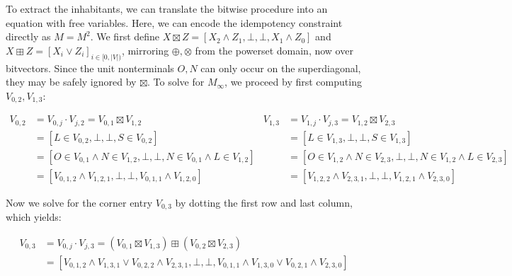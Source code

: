 \documentclass[sigplan,acmsmall,nonacm,screen]{acmart}\settopmatter{printfolios=false,printccs=false,printacmref=false}
\begin{document}

  To extract the inhabitants, we can translate the bitwise procedure into an equation with free variables. Here, we can encode the idempotency constraint directly as $M = M^2$. We first define $X \boxtimes Z = [X_2 \land Z_1, \bot, \bot, X_1 \land Z_0]$ and $X \boxplus Z = [X_i \lor Z_i]_{i \in [0, |V|)}$, mirroring $\oplus, \otimes$ from the powerset domain, now over bitvectors. Since the unit nonterminals $O, N$ can only occur on the superdiagonal, they may be safely ignored by $\boxtimes$. To solve for $M_\infty$, we proceed by first computing $V_{0, 2}, V_{1, 3}$:\vspace{-8pt}

  \begin{small}
  \begin{align*}
    V_{0, 2} &= V_{0, j} \cdot V_{j, 2} = V_{0, 1} \boxtimes V_{1, 2}                         &  V_{1, 3} &= V_{1, j} \cdot V_{j, 3} = V_{1, 2} \boxtimes V_{2, 3}\\
    &= [L \in V_{0, 2}, \bot, \bot, S \in V_{0, 2}]                                           &  &= [L \in V_{1, 3}, \bot, \bot, S \in V_{1, 3}]\\
    &= [O \in V_{0, 1} \land N \in V_{1, 2}, \bot, \bot, N \in V_{0, 1} \land L \in V_{1, 2}] &  &= [O \in V_{1, 2} \land N \in V_{2, 3}, \bot, \bot, N \in V_{1, 2} \land L \in V_{2, 3}]\\
    &= [V_{0, 1, 2} \land V_{1, 2, 1}, \bot, \bot, V_{0, 1, 1} \land V_{1, 2, 0}]             &  &= [V_{1, 2, 2} \land V_{2, 3, 1}, \bot, \bot, V_{1, 2, 1} \land V_{2, 3, 0}]
  \end{align*}
  \end{small}\vspace{-8pt}

  \noindent Now we solve for the corner entry $V_{0, 3}$ by dotting the first row and last column, which yields:\vspace{-8pt}

  \begin{align*}
    V_{0, 3} &= V_{0, j} \cdot V_{j, 3} = (V_{0, 1} \boxtimes V_{1, 3}) \boxplus (V_{0, 2} \boxtimes V_{2, 3})\\
    &= [V_{0, 1, 2} \land V_{1, 3, 1} \lor V_{0, 2, 2} \land V_{2, 3, 1}, \bot, \bot, V_{0, 1, 1} \land V_{1, 3, 0} \lor V_{0, 2, 1} \land V_{2, 3, 0}]
  \end{align*}
\end{document}
